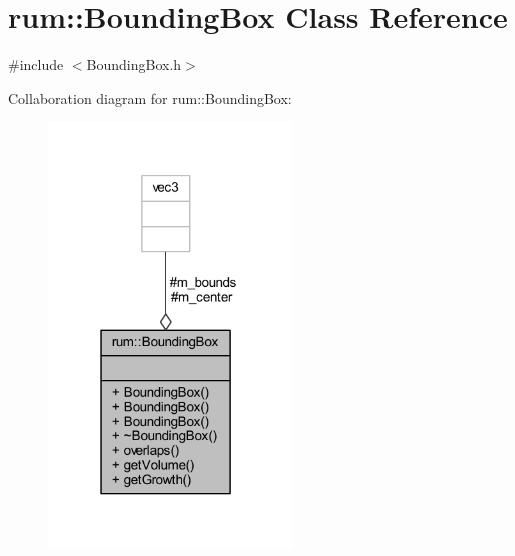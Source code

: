 \hypertarget{classrum_1_1_bounding_box}{}\section{rum\+:\+:Bounding\+Box Class Reference}
\label{classrum_1_1_bounding_box}


{\ttfamily \#include $<$Bounding\+Box.\+h$>$}



Collaboration diagram for rum\+:\+:Bounding\+Box\+:\nopagebreak
\begin{figure}[H]
\begin{center}
\leavevmode
\includegraphics[width=183pt]{classrum_1_1_bounding_box__coll__graph}
\end{center}
\end{figure}
